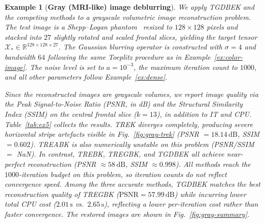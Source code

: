 \documentclass[11pt]{article}
\newtheorem{example}[theorem]{Example}
\def\fm#1{\mathcal{#1}}
\begin{document}
\begin{example}[\textbf{Gray (MRI-like) image deblurring}] \label{ex:gray}
We apply TGDBEK and the competing methods to a grayscale volumetric image reconstruction problem. The test image is a Shepp--Logan phantom~\cite{shepp1974fourier} resized to $128\times128$ pixels and stacked into $27$ slightly rotated and scaled frontal slices, yielding the target tensor $\fm X_\ast \in \mathbb{R}^{128\times128\times27}$. The Gaussian blurring operator is constructed with $\sigma=4$ and bandwidth $64$ following the same Toeplitz procedure as in Example~\ref{ex:color-image}. The noise level is set to $a=10^{-3}$, the maximum iteration count to $1000$, and all other parameters follow Example~\ref{ex:dense}.

Since the reconstructed images are grayscale volumes, we report image quality via the Peak Signal-to-Noise Ratio (PSNR, in dB) and the Structural Similarity Index (SSIM) on the central frontal slice ($k=13$), in addition to IT and CPU. Table~\ref{tab:ex5} collects the results. TREK diverges completely, producing severe horizontal stripe artefacts visible in Fig.~\ref{fig:gray-trek} (PSNR $= 18.14\,\mathrm{dB}$, SSIM $= 0.602$). TREABK is also numerically unstable on this problem (PSNR/SSIM $=$ NaN). In contrast, TREBK, TREGBK, and TGDBEK all achieve near-perfect reconstruction (PSNR $\approx 58\,\mathrm{dB}$, SSIM $\approx 0.998$). All methods reach the $1000$-iteration budget on this problem, so iteration counts do not reflect convergence speed. Among the three accurate methods, TGDBEK matches the best reconstruction quality of TREGBK ($\mathrm{PSNR}=57.99\,\mathrm{dB}$) while incurring lower total CPU cost ($2.01\,\mathrm{s}$ vs.\ $2.65\,\mathrm{s}$), reflecting a lower per-iteration cost rather than faster convergence. The restored images are shown in Fig.~\ref{fig:gray-summary}.


\end{example}
\end{document}
